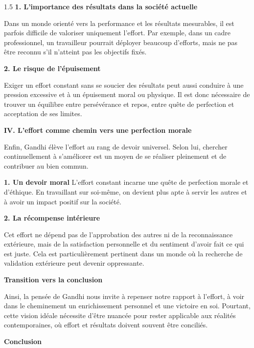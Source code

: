 \documentclass[12pt]{article}
\begin{document}
\begin{spacing}{1.5}
\textbf{1. L'importance des résultats dans la société actuelle}
  
   Dans un monde orienté vers la performance et les résultats mesurables, il est parfois difficile de valoriser uniquement l'effort. Par exemple, dans un cadre professionnel, un travailleur pourrait déployer beaucoup d'efforts, mais ne pas être reconnu s'il n'atteint pas les objectifs fixés. 
    
\textbf{2. Le risque de l'épuisement  }

   Exiger un effort constant sans se soucier des résultats peut aussi conduire à une pression excessive et à un épuisement moral ou physique. Il est donc nécessaire de trouver un équilibre entre persévérance et repos, entre quête de perfection et acceptation de ses limites.  

\textbf{IV. L'effort comme chemin vers une perfection morale}

Enfin, Gandhi élève l'effort au rang de devoir universel. Selon lui, chercher continuellement à s'améliorer est un moyen de se réaliser pleinement et de contribuer au bien commun.
  
\textbf{1. Un devoir moral } 
   L'effort constant incarne une quête de perfection morale et d'éthique. En travaillant sur soi-même, on devient plus apte à servir les autres et à avoir un impact positif sur la société.  
   
\textbf{2. La récompense intérieure  }

   Cet effort ne dépend pas de l'approbation des autres ni de la reconnaissance extérieure, mais de la satisfaction personnelle et du sentiment d'avoir fait ce qui est juste. Cela est particulièrement pertinent dans un monde où la recherche de validation extérieure peut devenir oppressante.


\textbf{Transition vers la conclusion}

Ainsi, la pensée de Gandhi nous invite à repenser notre rapport à l'effort, à voir dans le cheminement un enrichissement personnel et une victoire en soi. Pourtant, cette vision idéale nécessite d'être nuancée pour rester applicable aux réalités contemporaines, où effort et résultats doivent souvent être conciliés. 



\quad

\quad

\textbf{Conclusion}


\end{spacing}
\end{document}
